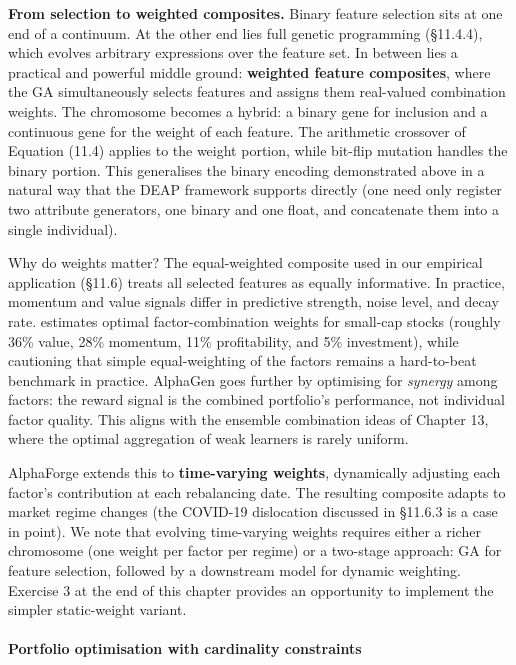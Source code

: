 \textbf{From selection to weighted composites.} Binary feature selection sits at one end of a continuum. At the other end lies full genetic programming (§11.4.4), which evolves arbitrary expressions over the feature set. In between lies a practical and powerful middle ground: \textbf{weighted feature composites}, where the GA simultaneously selects features and assigns them real-valued combination weights. The chromosome becomes a hybrid: a binary gene for inclusion and a continuous gene for the weight of each feature. The arithmetic crossover of Equation (11.4) applies to the weight portion, while bit-flip mutation handles the binary portion. This generalises the binary encoding demonstrated above in a natural way that the DEAP framework supports directly (one need only register two attribute generators, one binary and one float, and concatenate them into a single individual).

Why do weights matter? The equal-weighted composite used in our empirical application (§11.6) treats all selected features as equally informative. In practice, momentum and value signals differ in predictive strength, noise level, and decay rate. \cite{reschenhofer2024combining} estimates optimal factor-combination weights for small-cap stocks (roughly 36\% value, 28\% momentum, 11\% profitability, and 5\% investment), while cautioning that simple equal-weighting of the factors remains a hard-to-beat benchmark in practice. AlphaGen \citep{Yu2023} goes further by optimising for \textit{synergy} among factors: the reward signal is the combined portfolio's performance, not individual factor quality. This aligns with the ensemble combination ideas of Chapter 13, where the optimal aggregation of weak learners is rarely uniform.

AlphaForge \citep{Shi2025} extends this to \textbf{time-varying weights}, dynamically adjusting each factor's contribution at each rebalancing date. The resulting composite adapts to market regime changes (the COVID-19 dislocation discussed in §11.6.3 is a case in point). We note that evolving time-varying weights requires either a richer chromosome (one weight per factor per regime) or a two-stage approach: GA for feature selection, followed by a downstream model for dynamic weighting. Exercise 3 at the end of this chapter provides an opportunity to implement the simpler static-weight variant.

\paragraph{Portfolio optimisation with cardinality constraints}

